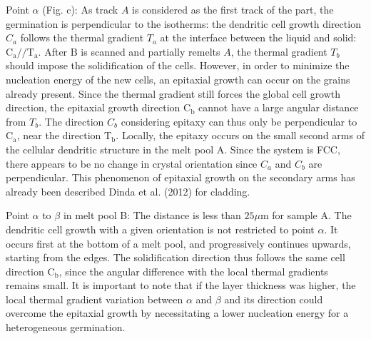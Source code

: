 \documentclass[10pt]{article}
\begin{document}
Point $\alpha$ (Fig. c): As track $A$ is considered as the first track of the part, the germination is perpendicular to the isotherms: the dendritic cell growth direction $C_{a}$ follows the thermal gradient $T_{a}$ at the interface between the liquid and solid: $\mathrm{C}_{\mathrm{a}} / / \mathrm{T}_{\mathrm{a}}$. After $\mathrm{B}$ is scanned and partially remelts $A$, the thermal gradient $T_{b}$ should impose the solidification of the cells. However, in order to minimize the nucleation energy of the new cells, an epitaxial growth can occur on the grains already present. Since the thermal gradient still forces the global cell growth direction, the epitaxial growth direction $\mathrm{C}_{\mathrm{b}}$ cannot have a large angular distance from $T_{b}$. The direction $C_{b}$ considering epitaxy can thus only be perpendicular to $\mathrm{C}_{\mathrm{a}}$, near the direction $\mathrm{T}_{\mathrm{b}}$. Locally, the epitaxy occurs on the small second arms of the cellular dendritic structure in the melt pool A. Since the system is FCC, there appears to be no change in crystal orientation since $C_{a}$ and $C_{b}$ are perpendicular. This phenomenon of epitaxial growth on the secondary arms has already been described Dinda et al. (2012) for cladding.

Point $\alpha$ to $\beta$ in melt pool B: The distance is less than $25 \mu \mathrm{m}$ for sample A. The dendritic cell growth with a given orientation is not restricted to point $\alpha$. It occurs first at the bottom of a melt pool, and progressively continues upwards, starting from the edges. The solidification direction thus follows the same cell direction $\mathrm{C}_{\mathrm{b}}$, since the angular difference with the local thermal gradients remains small. It is important to note that if the layer thickness was higher, the local thermal gradient variation between $\alpha$ and $\beta$ and its direction could overcome the epitaxial growth by necessitating a lower nucleation energy for a heterogeneous germination.
\end{document}
